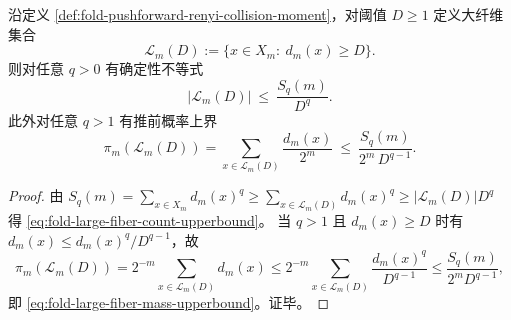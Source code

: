 \begin{proposition}[大纤维计数的纯矩上界]\label{prop:fold-large-fiber-moment-upperbounds}
沿定义 \ref{def:fold-pushforward-renyi-collision-moment}，对阈值 \(D\ge 1\) 定义大纤维集合
\[
\mathcal L_m(D):=\{x\in X_m:\ d_m(x)\ge D\}.
\]
则对任意 \(q>0\) 有确定性不等式
\begin{equation}\label{eq:fold-large-fiber-count-upperbound}
|\mathcal L_m(D)|\ \le\ \frac{S_q(m)}{D^q}.
\end{equation}
此外对任意 \(q>1\) 有推前概率上界
\begin{equation}\label{eq:fold-large-fiber-mass-upperbound}
\pi_m(\mathcal L_m(D))
=\sum_{x\in\mathcal L_m(D)}\frac{d_m(x)}{2^m}
\ \le\ \frac{S_q(m)}{2^m\,D^{q-1}}.
\end{equation}
\end{proposition}
\begin{proof}
由 \(S_q(m)=\sum_{x\in X_m}d_m(x)^q\ge \sum_{x\in\mathcal L_m(D)}d_m(x)^q\ge |\mathcal L_m(D)|D^q\) 得 \eqref{eq:fold-large-fiber-count-upperbound}。
当 \(q>1\) 且 \(d_m(x)\ge D\) 时有 \(d_m(x)\le d_m(x)^q/D^{q-1}\)，故
\[
\pi_m(\mathcal L_m(D))
=2^{-m}\sum_{x\in\mathcal L_m(D)}d_m(x)
\le 2^{-m}\sum_{x\in\mathcal L_m(D)}\frac{d_m(x)^q}{D^{q-1}}
\le \frac{S_q(m)}{2^mD^{q-1}},
\]
即 \eqref{eq:fold-large-fiber-mass-upperbound}。证毕。
\end{proof}

